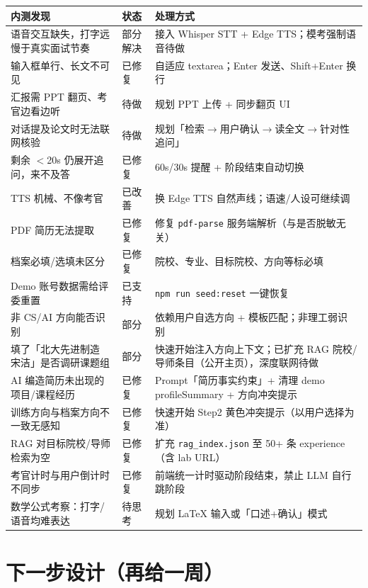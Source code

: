 \documentclass[11pt, a4paper]{article}
\begin{document}
\small
\begin{tabularx}{\textwidth}{@{}p{} p{} X@{}}
\toprule
\textbf{内测发现} & \textbf{状态} & \textbf{处理方式} \\
\midrule
语音交互缺失，打字远慢于真实面试节奏 & 部分解决 & 接入 Whisper STT + Edge TTS；模考强制语音待做 \\
输入框单行、长文不可见 & 已修复 & 自适应 textarea；Enter 发送、Shift+Enter 换行 \\
汇报需 PPT 翻页、考官边看边听 & 待做 & 规划 PPT 上传 + 同步翻页 UI \\
对话提及论文时无法联网核验 & 待做 & 规划「检索$\to$用户确认$\to$读全文$\to$针对性追问」 \\
剩余 $<$20s 仍展开追问，来不及答 & 已修复 & 60s/30s 提醒 + 阶段结束自动切换 \\
TTS 机械、不像考官 & 已改善 & 换 Edge TTS 自然声线；语速/人设可继续调 \\
PDF 简历无法提取 & 已修复 & 修复 \texttt{pdf-parse} 服务端解析（与是否脱敏无关） \\
档案必填/选填未区分 & 已修复 & 院校、专业、目标院校、方向等标必填 \\
Demo 账号数据需给评委重置 & 已支持 & \texttt{npm run seed:reset} 一键恢复 \\
非 CS/AI 方向能否识别 & 部分 & 依赖用户自选方向 + 模板匹配；非理工弱识别 \\
填了「北大先进制造 宋洁」是否调研课题组 & 部分 & 快速开始注入方向上下文；已扩充 RAG 院校/导师条目（公开主页），深度联网待做 \\
AI 编造简历未出现的项目/课程经历 & 已修复 & Prompt「简历事实约束」+ 清理 demo profileSummary + 方向冲突提示 \\
训练方向与档案方向不一致无感知 & 已修复 & 快速开始 Step2 黄色冲突提示（以用户选择为准） \\
RAG 对目标院校/导师检索为空 & 已修复 & 扩充 \texttt{rag\_index.json} 至 50+ 条 experience（含 lab URL） \\
考官计时与用户倒计时不同步 & 已修复 & 前端统一计时驱动阶段结束，禁止 LLM 自行跳阶段 \\
数学公式考察：打字/语音均难表达 & 待思考 & 规划 LaTeX 输入或「口述+确认」模式 \\
\bottomrule
\end{tabularx}
\normalsize

\section{下一步设计（再给一周）}
\end{document}
